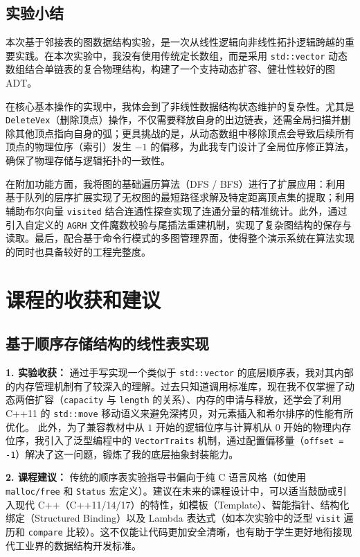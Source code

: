 \documentclass[supercite]{Experimental_Report}
\theoremstyle{definition}
\begin{document}
\newpage

\subsection{实验小结}
本次基于邻接表的图数据结构实验，是一次从线性逻辑向非线性拓扑逻辑跨越的重要实践。在本次实验中，我没有使用传统定长数组，而是采用 \texttt{std::vector} 动态数组结合单链表的复合物理结构，构建了一个支持动态扩容、健壮性较好的图 ADT。

在核心基本操作的实现中，我体会到了非线性数据结构状态维护的复杂性。尤其是 \texttt{DeleteVex}（删除顶点）操作，不仅需要释放自身的出边链表，还需全局扫描并删除其他顶点指向自身的弧；更具挑战的是，从动态数组中移除顶点会导致后续所有顶点的物理位序（索引）发生 $-1$ 的偏移，为此我专门设计了全局位序修正算法，确保了物理存储与逻辑拓扑的一致性。

在附加功能方面，我将图的基础遍历算法（DFS / BFS）进行了扩展应用：利用基于队列的层序扩展实现了无权图的最短路径求解及特定距离顶点集的提取；利用辅助布尔向量 \texttt{visited} 结合连通性探查实现了连通分量的精准统计。此外，通过引入自定义的 \texttt{AGRH} 文件魔数校验与尾插法重建机制，实现了复杂图结构的保存与读取。最后，配合基于命令行模式的多图管理界面，使得整个演示系统在算法实现的同时也具备较好的工程完整度。

\newpage

\section{课程的收获和建议}

\subsection{基于顺序存储结构的线性表实现}

\textbf{1. 实验收获：}
通过手写实现一个类似于 \texttt{std::vector} 的底层顺序表，我对其内部的内存管理机制有了较深入的理解。过去只知道调用标准库，现在我不仅掌握了动态两倍扩容（\texttt{capacity} 与 \texttt{length} 的关系）、内存的申请与释放，还学会了利用 C++11 的 \texttt{std::move} 移动语义来避免深拷贝，对元素插入和希尔排序的性能有所优化。
此外，为了兼容教材中从 $1$ 开始的逻辑位序与计算机从 $0$ 开始的物理内存位序，我引入了泛型编程中的 \texttt{VectorTraits} 机制，通过配置偏移量（\texttt{offset = -1}）解决了这一问题，锻炼了我的底层抽象封装能力。

\textbf{2. 课程建议：}
传统的顺序表实验指导书偏向于纯 C 语言风格（如使用 \texttt{malloc/free} 和 \texttt{Status} 宏定义）。建议在未来的课程设计中，可以适当鼓励或引入现代 C++（C++11/14/17）的特性，如模板（Template）、智能指针、结构化绑定（Structured Binding）以及 Lambda 表达式（如本次实验中的泛型 \texttt{visit} 遍历和 \texttt{compare} 比较）。这不仅能让代码更加安全清晰，也有助于学生更好地衔接现代工业界的数据结构开发标准。
\end{document}
